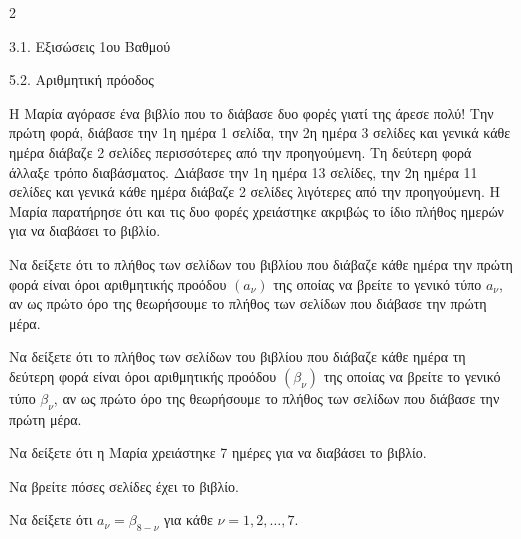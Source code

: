 \begin{ylh}{2}
    \item 3.1. Εξισώσεις 1ου Βαθμού
    \item 5.2. Αριθμητική πρόοδος
\end{ylh}
Η Μαρία αγόρασε ένα βιβλίο που το διάβασε δυο φορές γιατί της άρεσε πολύ!
Την πρώτη φορά, διάβασε την 1η ημέρα 1 σελίδα, την 2η ημέρα 3 σελίδες και γενικά κάθε ημέρα διάβαζε 2 σελίδες περισσότερες από την προηγούμενη. Τη δεύτερη φορά άλλαξε τρόπο διαβάσματος. Διάβασε την 1η ημέρα 13 σελίδες, την 2η ημέρα 11 σελίδες και γενικά κάθε ημέρα διάβαζε 2 σελίδες λιγότερες από την προηγούμενη. Η Μαρία παρατήρησε ότι και τις δυο φορές χρειάστηκε ακριβώς το ίδιο πλήθος ημερών για να διαβάσει το βιβλίο.

\begin{alist}
\item

\begin{rlist}
\item Να δείξετε ότι το πλήθος των σελίδων του βιβλίου που διάβαζε κάθε ημέρα την πρώτη φορά είναι όροι αριθμητικής προόδου $\left( a_{\nu} \right)$ της οποίας να βρείτε το γενικό τύπο $a_{\nu}$, αν ως πρώτο όρο της θεωρήσουμε το πλήθος των σελίδων που διάβασε την πρώτη μέρα.
\item Να δείξετε ότι το πλήθος των σελίδων του βιβλίου που διάβαζε κάθε ημέρα τη δεύτερη φορά είναι όροι αριθμητικής προόδου $\left( \beta_{\nu} \right)$ της οποίας να βρείτε το γενικό τύπο $\beta_{\nu}$, αν ως πρώτο όρο της θεωρήσουμε το πλήθος των σελίδων που διάβασε την πρώτη μέρα.
\end{rlist}
\item Να δείξετε ότι η Μαρία χρειάστηκε 7 ημέρες για να διαβάσει το βιβλίο.
\item Να βρείτε πόσες σελίδες έχει το βιβλίο.
\item Να δείξετε ότι $a_{\nu} = \beta_{8-\nu}$ για κάθε $\nu = 1, 2, \dots, 7$.
\end{alist}

